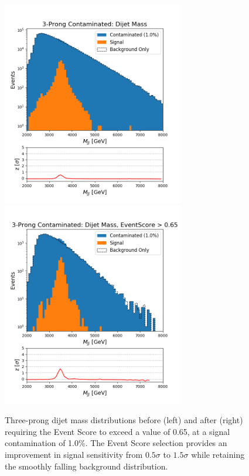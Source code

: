 \documentclass[12pt, a4paper]{article}
\begin{document}
\begin{figure}[H]
	\begin{center}
		\includegraphics[width=225pt]{imgs/bugfix/3Prong_Contaminated_1p0_JJ_Mass_Multi_SaveForPaper_Lead.png}
		\includegraphics[width=225pt]{imgs/bugfix/3Prong_Contaminated_1p0_JJ_Mass_EventScore0p65_Multi_SaveForPaper_Lead.png}
	\end{center}
	\caption{Three-prong dijet mass distributions before (left) and after (right) requiring the Event Score to exceed a value of 0.65, at a signal contamination of 1.0\%. The Event Score selection provides an improvement in signal sensitivity from $0.5\sigma$ to $1.5\sigma$ while retaining the smoothly falling background distribution.}
	\label{fig:3p_dijet}
\end{figure}



\end{document}
